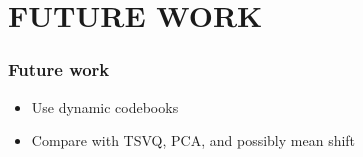 \section{FUTURE WORK}
\begin{frame}
\frametitle{Future work}
\mypagenum
	\begin{itemize}
		\item Use dynamic codebooks
		\item Compare with TSVQ, PCA, and possibly mean shift
	\end{itemize}
\end{frame}




\printbibliography


